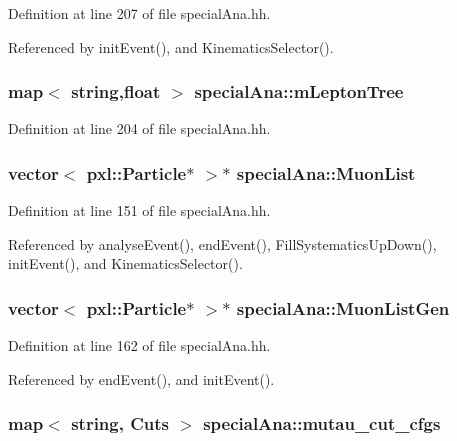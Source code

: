 Definition at line 207 of file special\-Ana.\-hh.



Referenced by init\-Event(), and Kinematics\-Selector().

\subsubsection[{m\-Lepton\-Tree}]{\setlength{\rightskip}{0pt plus 5cm}map$<$ string,float $>$ special\-Ana\-::m\-Lepton\-Tree}\label{classspecialAna_ae7c181ead078f2fec53d80943afe9352}


Definition at line 204 of file special\-Ana.\-hh.

\subsubsection[{Muon\-List}]{\setlength{\rightskip}{0pt plus 5cm}vector$<$ pxl\-::\-Particle$\ast$ $>$$\ast$ special\-Ana\-::\-Muon\-List}\label{classspecialAna_a6bcf2c30750671faeda4f4b38a4cfbb7}


Definition at line 151 of file special\-Ana.\-hh.



Referenced by analyse\-Event(), end\-Event(), Fill\-Systematics\-Up\-Down(), init\-Event(), and Kinematics\-Selector().

\subsubsection[{Muon\-List\-Gen}]{\setlength{\rightskip}{0pt plus 5cm}vector$<$ pxl\-::\-Particle$\ast$ $>$$\ast$ special\-Ana\-::\-Muon\-List\-Gen}\label{classspecialAna_ab7b983c53e3c9bc2f4677fc76ef65fb0}


Definition at line 162 of file special\-Ana.\-hh.



Referenced by end\-Event(), and init\-Event().

\subsubsection[{mutau\-\_\-cut\-\_\-cfgs}]{\setlength{\rightskip}{0pt plus 5cm}map$<$ string, {\bf Cuts} $>$ special\-Ana\-::mutau\-\_\-cut\-\_\-cfgs}\label{classspecialAna_a1cc60d87fb53c47860a45b50f996147f}


